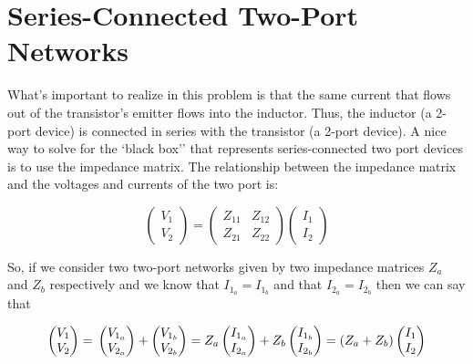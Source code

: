 \section{Series-Connected Two-Port Networks}
\setcounter{equation}{0}
\addtocounter{section}{1}

What's important to realize in this problem is that the same current that flows
out of the transistor's emitter flows into the inductor. Thus, the inductor (a
2-port device) is connected in series with the transistor (a 2-port device). A
nice way to solve for the `black box'' that represents series-connected two port
devices is to use the impedance matrix. The relationship between the impedance
matrix and the voltages and currents of the two port is:

\[ 
    \begin{pmatrix} V_1 \\ V_2 \end{pmatrix} =
    \begin{pmatrix} Z_{11} & Z_{12} \\ Z_{21} & Z_{22} \end{pmatrix} 
    \begin{pmatrix} I_1 \\ I_2 \end{pmatrix}
\]

So, if we consider two two-port networks given by two impedance matrices $Z_a$
and $Z_b$ respectively and we know that $I_{1_a} = I_{1_b}$ and that $I_{2_a} =
I_{2_b}$
then we can say that

\[ 
    \begin{pmatrix} V_{1} \\ V_{2} \end{pmatrix} =  \\
    \begin{pmatrix} V_{1_a} \\ V_{2_a} \end{pmatrix} + \begin{pmatrix} V_{1_b} \\
    V_{2_b} \end{pmatrix} =
    Z_a \begin{pmatrix} I_{1_a} \\ I_{2_a} \end{pmatrix} + Z_b \begin{pmatrix}
    I_{1_b} \\ I_{2_b} \end{pmatrix} =
    \left( Z_a+Z_b \right) \begin{pmatrix} I_{1} \\ I_{2} \end{pmatrix}
\]

